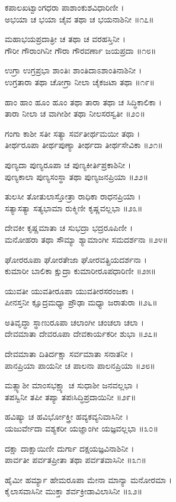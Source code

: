 ಕಪಾಲಖಟ್ವಾಂಗಧರಾ ಪಾಶಾಂಕುಶವಿಧಾರಿಣೀ ।\\
ಅಭಯಾ ಚ ಭಯಾ ಚೈವ ತಥಾ ಚ ಭಯನಾಶಿನೀ ॥೧೭॥

ಮಹಾಭಯಪ್ರದಾತ್ರೀ ಚ ತಥಾ ಚ ವರಹಸ್ತಿನೀ ।\\
ಗೌರೀ ಗೌರಾಂಗಿನೀ ಗೌರಾ ಗೌರವರ್ಣಾ ಜಯಪ್ರದಾ ॥೧೮॥

ಉಗ್ರಾ ಉಗ್ರಪ್ರಭಾ ಶಾಂತಿಃ ಶಾಂತಿದಾಽಶಾಂತಿನಾಶಿನೀ ।\\
ಉಗ್ರತಾರಾ ತಥಾ ಚೋಗ್ರಾ ನೀಲಾ ಚೈಕಜಟಾ ತಥಾ ॥೧೯॥

ಹಾಂ ಹಾಂ ಹೂಂ ಹೂಂ ತಥಾ ತಾರಾ ತಥಾ ಚ ಸಿದ್ಧಿಕಾಲಿಕಾ ।\\
ತಾರಾ ನೀಲಾ ಚ ವಾಗೀಶೀ ತಥಾ ನೀಲಸರಸ್ವತೀ ॥೨೦॥

ಗಂಗಾ ಕಾಶೀ ಸತೀ ಸತ್ಯಾ ಸರ್ವತೀರ್ಥಮಯೀ ತಥಾ ।\\
ತೀರ್ಥರೂಪಾ ತೀರ್ಥಪುಣ್ಯಾ ತೀರ್ಥದಾ ತೀರ್ಥಸೇವಿಕಾ ॥೨೧॥

ಪುಣ್ಯದಾ ಪುಣ್ಯರೂಪಾ ಚ ಪುಣ್ಯಕೀರ್ತಿಪ್ರಕಾಶಿನೀ ।\\
ಪುಣ್ಯಕಾಲಾ ಪುಣ್ಯಸಂಸ್ಥಾ ತಥಾ ಪುಣ್ಯಜನಪ್ರಿಯಾ ॥೨೨॥

ತುಲಸೀ ತೋತುಲಾಸ್ತೋತ್ರಾ ರಾಧಿಕಾ ರಾಧನಪ್ರಿಯಾ ।\\
ಸತ್ಯಾಸತ್ಯಾ ಸತ್ಯಭಾಮಾ ರುಕ್ಮಿಣೀ ಕೃಷ್ಣವಲ್ಲಭಾ ॥೨೩॥

ದೇವಕೀ ಕೃಷ್ಣಮಾತಾ ಚ ಸುಭದ್ರಾ ಭದ್ರರೂಪಿಣೀ ।\\
ಮನೋಹರಾ ತಥಾ ಸೌಮ್ಯಾ ಶ್ಯಾಮಾಂಗೀ ಸಮದರ್ಶನಾ ॥೨೪॥

ಘೋರರೂಪಾ ಘೋರತೇಜಾ ಘೋರವತ್ಪ್ರಿಯದರ್ಶನಾ ।\\
ಕುಮಾರೀ ಬಾಲಿಕಾ ಕ್ಷುದ್ರಾ ಕುಮಾರೀರೂಪಧಾರಿಣೀ ॥೨೫॥

ಯುವತೀ ಯುವತೀರೂಪಾ ಯುವತೀರಸರಂಜಕಾ ।\\
ಪೀನಸ್ತನೀ ಕ್ಷೂದ್ರಮಧ್ಯಾ ಪ್ರೌಢಾ ಮಧ್ಯಾ ಜರಾತುರಾ ॥೨೬॥

ಅತಿವೃದ್ಧಾ ಸ್ಥಾಣುರೂಪಾ ಚಲಾಂಗೀ ಚಂಚಲಾ ಚಲಾ ।\\
ದೇವಮಾತಾ ದೇವರೂಪಾ ದೇವಕಾರ್ಯಕರೀ ಶುಭಾ ॥೨೭॥

ದೇವಮಾತಾ ದಿತಿರ್ದಕ್ಷಾ ಸರ್ವಮಾತಾ ಸನಾತನೀ ।\\
ಪಾನಪ್ರಿಯಾ ಪಾಯನೀ ಚ ಪಾಲನಾ ಪಾಲನಪ್ರಿಯಾ ॥೨೮॥

ಮತ್ಸ್ಯಾಶೀ ಮಾಂಸಭಕ್ಷ್ಯಾ ಚ ಸುಧಾಶೀ ಜನವಲ್ಲಭಾ ।\\
ತಪಸ್ವಿನೀ ತಪೀ ತಪ್ಯಾ ತಪಃಸಿದ್ಧಿಪ್ರದಾಯಿನೀ ॥೨೯॥

ಹವಿಷ್ಯಾ ಚ ಹವಿರ್ಭೋಕ್ತ್ರೀ ಹವ್ಯಕವ್ಯನಿವಾಸಿನೀ ।\\
ಯಜುರ್ವೇದಾ ವಶ್ಯಕರೀ ಯಜ್ಞಾಂಗೀ ಯಜ್ಞವಲ್ಲಭಾ ॥೩೦॥

ದಕ್ಷಾ ದಾಕ್ಷಾಯಿಣೀ ದುರ್ಗಾ ದಕ್ಷಯಜ್ಞವಿನಾಶಿನೀ ।\\
ಪಾರ್ವತೀ ಪರ್ವತಪ್ರೀತಾ ತಥಾ ಪರ್ವತವಾಸಿನೀ ॥೩೧॥

ಹೈಮೀ ಹರ್ಮ್ಯಾ ಹೇಮರೂಪಾ ಮೇನಾ ಮಾನ್ಯಾ ಮನೋರಮಾ ।\\
ಕೈಲಾಸವಾಸಿನೀ ಮುಕ್ತಾ ಶರ್ವಕ್ರೀಡಾವಿಲಾಸಿನೀ ॥೩೨॥

